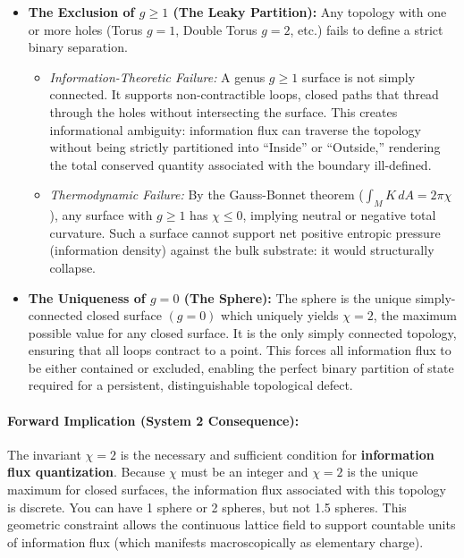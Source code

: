 \begin{itemize}
    \item \textbf{The Exclusion of $g \geq 1$ (The Leaky Partition):} Any topology with one or more holes (Torus $g=1$, Double Torus $g=2$, etc.) fails to define a strict binary separation.
    \begin{itemize}
        \item \textit{Information-Theoretic Failure:} A genus $g \geq 1$ surface is not simply connected. It supports non-contractible loops, closed paths that thread through the holes without intersecting the surface. This creates informational ambiguity: information flux can traverse the topology without being strictly partitioned into ``Inside'' or ``Outside,'' rendering the total conserved quantity associated with the boundary ill-defined.
        
        \item \textit{Thermodynamic Failure:} By the Gauss-Bonnet theorem ($\int_M K \, dA = 2\pi\chi$), any surface with $g \geq 1$ has $\chi \leq 0$, implying neutral or negative total curvature. Such a surface cannot support net positive entropic pressure (information density) against the bulk substrate: it would structurally collapse.
    \end{itemize}

    \item \textbf{The Uniqueness of $g=0$ (The Sphere):}
    The sphere is the unique simply-connected closed surface $(g=0)$ which uniquely yields $\chi=2$, the maximum possible value for any closed surface. It is the only simply connected topology, ensuring that all loops contract to a point. This forces all information flux to be either contained or excluded, enabling the perfect binary partition of state required for a persistent, distinguishable topological defect.
\end{itemize}

\paragraph{Forward Implication (System 2 Consequence):} 
The invariant $\chi=2$ is the necessary and sufficient condition for \textbf{information flux quantization}. Because $\chi$ must be an integer and $\chi=2$ is the unique maximum for closed surfaces, the information flux associated with this topology is discrete. You can have 1 sphere or 2 spheres, but not 1.5 spheres. This geometric constraint allows the continuous lattice field to support countable units of information flux (which manifests macroscopically as elementary charge).

